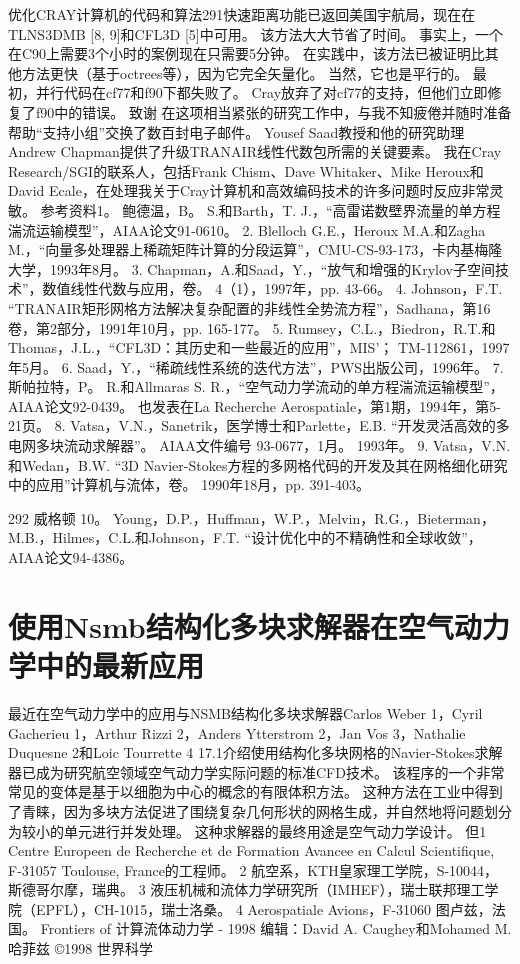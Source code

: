 \documentclass[UTF8,11pt,a4paper,openany,fontset=fandol]{ctexbook}
\begin{document}
优化CRAY计算机的代码和算法291快速距离功能已返回美国宇航局，现在在TLNS3DMB [8, 9]和CFL3D [5]中可用。 该方法大大节省了时间。 事实上，一个在C90上需要3个小时的案例现在只需要5分钟。 在实践中，该方法已被证明比其他方法更快（基于octrees等），因为它完全矢量化。 当然，它也是平行的。 最初，并行代码在cf77和f90下都失败了。 Cray放弃了对cf77的支持，但他们立即修复了f90中的错误。 致谢 在这项相当紧张的研究工作中，与我不知疲倦并随时准备帮助“支持小组”交换了数百封电子邮件。 Yousef Saad教授和他的研究助理Andrew Chapman提供了升级TRANAIR线性代数包所需的关键要素。 我在Cray Research/SGI的联系人，包括Frank Chism、Dave Whitaker、Mike Heroux和David Ecale，在处理我关于Cray计算机和高效编码技术的许多问题时反应非常灵敏。 参考资料1。 鲍德温，B。 S.和Barth，T. J.，“高雷诺数壁界流量的单方程湍流运输模型”，AIAA论文91-0610。 2. Blelloch G.E.，Heroux M.A.和Zagha M.，“向量多处理器上稀疏矩阵计算的分段运算”，CMU-CS-93-173，卡内基梅隆大学，1993年8月。 3. Chapman，A.和Saad，Y.，“放气和增强的Krylov子空间技术”，数值线性代数与应用，卷。 4（1），1997年，pp. 43-66。 4. Johnson，F.T. “TRANAIR矩形网格方法解决复杂配置的非线性全势流方程”，Sadhana，第16卷，第2部分，1991年10月，pp. 165-177。 5. Rumsey，C.L.，Biedron，R.T.和Thomas，J.L.，“CFL3D：其历史和一些最近的应用”，MIS'； TM-112861，1997年5月。 6. Saad，Y.，“稀疏线性系统的迭代方法”，PWS出版公司，1996年。 7. 斯帕拉特，P。 R.和Allmaras S. R.，“空气动力学流动的单方程湍流运输模型”，AIAA论文92-0439。 也发表在La Recherche Aerospatiale，第1期，1994年，第5-21页。 8. Vatsa，V.N.，Sanetrik，医学博士和Parlette，E.B. “开发灵活高效的多电网多块流动求解器”。 AIAA文件编号 93-0677，1月。 1993年。 9. Vatsa，V.N.和Wedan，B.W. “3D Navier-Stokes方程的多网格代码的开发及其在网格细化研究中的应用”计算机与流体，卷。 1990年18月，pp. 391-403。

292 威格顿 10。 Young，D.P.，Huffman，W.P.，Melvin，R.G.，Bieterman，M.B.，Hilmes，C.L.和Johnson，F.T. “设计优化中的不精确性和全球收敛”，AIAA论文94-4386。

\clearpage
\chapter{使用Nsmb结构化多块求解器在空气动力学中的最新应用}
最近在空气动力学中的应用与NSMB结构化多块求解器Carlos Weber 1，Cyril Gacherieu 1，Arthur Rizzi 2，Anders Ytterstrom 2，Jan Vos 3，Nathalie Duquesne 2和Loic Tourrette 4 17.1介绍使用结构化多块网格的Navier-Stokes求解器已成为研究航空领域空气动力学实际问题的标准CFD技术。 该程序的一个非常常见的变体是基于以细胞为中心的概念的有限体积方法。 这种方法在工业中得到了青睐，因为多块方法促进了围绕复杂几何形状的网格生成，并自然地将问题划分为较小的单元进行并发处理。 这种求解器的最终用途是空气动力学设计。 但1 Centre Europeen de Recherche et de Formation Avancee en Calcul Scientifique, F-31057 Toulouse, France的工程师。 2 航空系，KTH皇家理工学院，S-10044，斯德哥尔摩，瑞典。 3 液压机械和流体力学研究所（IMHEF），瑞士联邦理工学院（EPFL），CH-1015，瑞士洛桑。 4 Aerospatiale Avions，F-31060 图卢兹，法国。 Frontiers of 计算流体动力学 - 1998 编辑：David A. Caughey和Mohamed M. 哈菲兹 ©1998 世界科学
\end{document}
